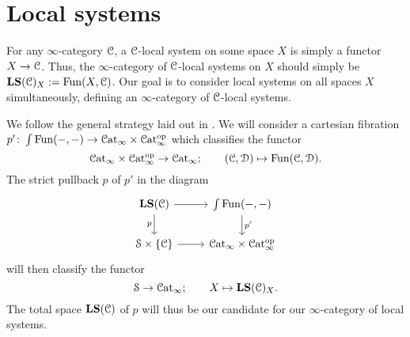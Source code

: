 \documentclass[main.tex]{subfiles}
\begin{document}
\section{Local systems}
\label{sec:local_systems}

For any $\infty$-category $\mathcal{C}$, a $\mathcal{C}$-local system on some space $X$ is simply a functor $X \to \mathcal{C}$. Thus, the $\infty$-category of $\mathcal{C}$-local systems on $X$ should simply be $\mathbf{LS}(\mathcal{C})_{X}:=\mathrm{Fun}(X, \mathcal{C})$. Our goal is to consider local systems on all spaces $X$ simultaneously, defining an $\infty$-category of $\mathcal{C}$-local systems.

We follow the general strategy laid out in \cite{luriehopkins2013ambidexterity}. We will consider a cartesian fibration $p'\colon\int\mathrm{Fun}(-, -) \to \mathcal{C}\mathrm{at}_{\infty} \times \mathcal{C}\mathrm{at}_{\infty}^{\mathrm{op}}$ which classifies the functor
\begin{equation*}
  \mathcal{C}\mathrm{at}_{\infty} \times \mathcal{C}\mathrm{at}_{\infty}^{\mathrm{op}} \to \mathcal{C}\mathrm{at}_{\infty};\qquad (\mathcal{C}, \mathcal{D}) \mapsto \mathrm{Fun}(\mathcal{C}, \mathcal{D}).
\end{equation*}
The strict pullback $p$ of $p'$ in the diagram
\begin{equation*}
  \begin{tikzcd}
    \LS(\category{C})
    \arrow[r]
    \arrow[d, swap, "p"]
    & \int\Fun(-, -)
    \arrow[d, "p'"]
    \\
    \S \times \{\category{C}\}
    \arrow[r]
    & \ICat \times \ICat\op
  \end{tikzcd}
\end{equation*}
will then classify the functor
\begin{equation*}
  \mathcal{S} \to \mathcal{C}\mathrm{at}_{\infty};\qquad X \mapsto \mathbf{LS}(\mathcal{C})_{X}.
\end{equation*}
The total space $\mathbf{LS}(\mathcal{C})$ of $p$ will thus be our candidate for our $\infty$-category of local systems.
\end{document}
